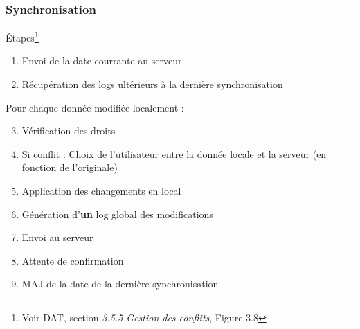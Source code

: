\begin{frame}
\frametitle{Synchronisation}

\begin{block}{Étapes\footnote{Voir DAT, section \emph{3.5.5 Gestion des conflits}, Figure 3.8}}
\begin{enumerate}
    \item Envoi de la date courrante au serveur %
    \item Récupération des logs ultérieurs à la dernière synchronisation
\end{enumerate}
\vspace{-1em}
\hspace*{.05\linewidth}\begin{minipage}{.9\linewidth}
    \begin{block}{Pour chaque donnée modifiée localement :}
    \begin{enumerate}
    \setcounter{enumi}{2}
        \item Vérification des droits
        \item Si conflit : Choix de l'utilisateur entre la donnée locale et la serveur (en fonction de l'originale)
    \end{enumerate}
    \end{block}
\end{minipage}
\begin{enumerate}
\setcounter{enumi}{4}
    \item Application des changements en local
    \item Génération d'\textbf{un} log global des modifications
    \item Envoi au serveur
    \item Attente de confirmation
    \item MAJ de la date de la dernière synchronisation
\end{enumerate}
\end{block} 

\end{frame} %

